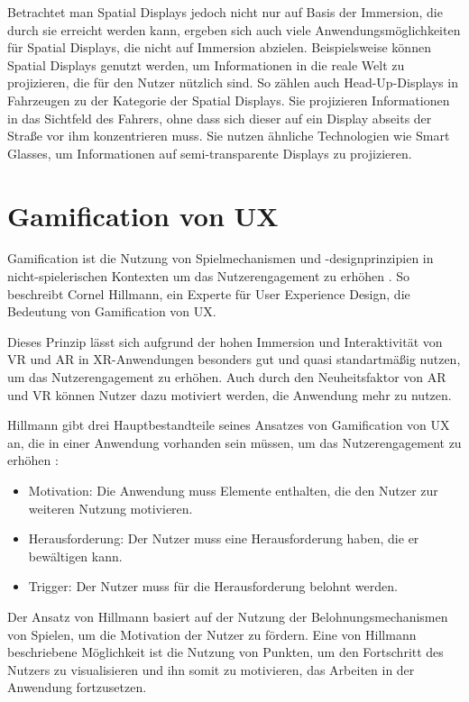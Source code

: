   Betrachtet man Spatial Displays jedoch nicht nur auf Basis der Immersion, die durch sie erreicht werden kann, ergeben sich auch viele Anwendungsmöglichkeiten für Spatial Displays, die nicht auf Immersion abzielen.
  Beispielsweise können Spatial Displays genutzt werden, um Informationen in die reale Welt zu projizieren, die für den Nutzer nützlich sind.
  So zählen auch Head-Up-Displays in Fahrzeugen zu der Kategorie der Spatial Displays.
  Sie projizieren Informationen in das Sichtfeld des Fahrers, ohne dass sich dieser auf ein Display abseits der Straße vor ihm konzentrieren muss.
  Sie nutzen ähnliche Technologien wie Smart Glasses, um Informationen auf semi-transparente Displays zu projizieren.

  
\section{Gamification von UX}
\label{sec:gamification-ux}

\glqq{}Gamification ist die Nutzung von Spielmechanismen und -designprinzipien in nicht-spielerischen Kontexten um das Nutzerengagement zu erhöhen\grqq{} \autocite[][S.63]{hillmann2021ux}.
So beschreibt Cornel Hillmann, ein Experte für User Experience Design, die Bedeutung von Gamification von UX.

Dieses Prinzip lässt sich aufgrund der hohen Immersion und Interaktivität von VR und AR in XR-Anwendungen besonders gut und quasi standartmäßig nutzen, um das Nutzerengagement zu erhöhen.
Auch durch den Neuheitsfaktor von AR und VR können Nutzer dazu motiviert werden, die Anwendung mehr zu nutzen.

Hillmann gibt drei Hauptbestandteile seines Ansatzes von Gamification von UX an, die in einer Anwendung vorhanden sein müssen, um das Nutzerengagement zu erhöhen \autocite[S.66]{hillmann2021ux}:
\begin{itemize}
  \item Motivation: Die Anwendung muss Elemente enthalten, die den Nutzer zur weiteren Nutzung motivieren.
  \item Herausforderung: Der Nutzer muss eine Herausforderung haben, die er bewältigen kann.
  \item Trigger: Der Nutzer muss für die Herausforderung belohnt werden.
\end{itemize}

Der Ansatz von Hillmann basiert auf der Nutzung der Belohnungsmechanismen von Spielen, um die Motivation der Nutzer zu fördern.
Eine von Hillmann beschriebene Möglichkeit ist die Nutzung von Punkten, um den Fortschritt des Nutzers zu visualisieren und ihn somit zu motivieren, das Arbeiten in der Anwendung fortzusetzen.


